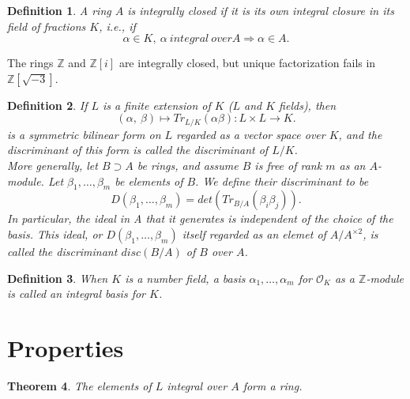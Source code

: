 \documentclass[11pt,a4paper,reqno]{amsart}
\numberwithin{equation}{section}
\newtheorem{thm}{Theorem}[section]
\newtheorem{defn}[thm]{Definition}
\newtheorem{ex}[thm]{Example}
\begin{document}
\begin{defn} \label{defn 2.8} 
A ring $A$ is integrally closed 
if it is its own integral closure in its field of fractions $K$, 
i.e., if 
\[ 
\alpha \in K,~ \alpha ~integral~over A \Rightarrow \alpha \in A. 
\] 
\end{defn} 

The rings $\mathbb{Z}$ and $\mathbb{Z}[i]$ are integrally closed, 
but unique factorization fails in $\mathbb{Z}[\sqrt{-3}]$.

\begin{defn} 
If $L$ is a finite extension of $K$ ($L$ and $K$ fields), then 
\[ 
(\alpha ,~ \beta ) \mapsto Tr_{L/K}(\alpha \beta ):L \times L \rightarrow K. 
\] 
is a symmetric bilinear form on $L$ regarded as a vector space over $K$, 
and the discriminant of this form is called the discriminant of $L/K$.\\ 
More generally, let $B \supset A$ be rings, and assume $B$ is free of rank $m$ as an $A$-module. 
Let $ \beta_1 ,\dots, \beta_m$ be elements of $B$. 
We define their discriminant to be 
\[ 
D(\beta_1 ,\dots, \beta_m )=det(Tr_{B/A}(\beta_i \beta_j )). 
\] 
In particular, the ideal in A that it generates is independent of the choice of the basis. 
This ideal, or $D( \beta_1,\dots,\beta_m )$ itself regarded as an elemet of $A/{A^{\times2}}$, 
is called the discriminant $disc(B/A)$ of $B$ over $A$. 
\end{defn} 

\begin{defn} \label{defn 2.32} 
When $K$ is a number field, a basis $\alpha_1, \dots, \alpha_m$ for $\mathcal{O}_K$ as a $\mathbb{Z}$-module is 
called an integral basis for $K$. 
\end{defn} 


\section{Properties}

\begin{thm}\label{m2.1} 
The elements of $L$ integral over $A$ form a ring. 
\end{thm} 
\end{document}
